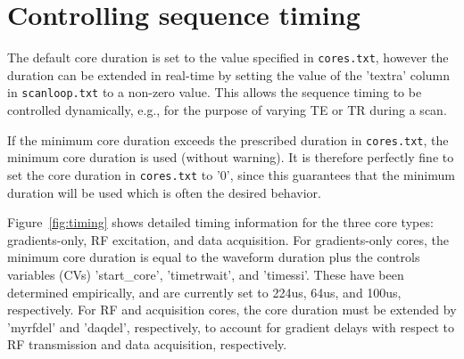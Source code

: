 
\chapter{Controlling sequence timing}
\label{ch:timing}

The default core duration is set to the value specified in \texttt{cores.txt}, however the duration can be extended in real-time by setting the value of the 'textra' column in {\tt scanloop.txt} to a non-zero value.
This allows the sequence timing to be controlled dynamically, e.g., for the purpose of varying TE or TR during a scan.

If the minimum core duration exceeds the prescribed duration in {\tt cores.txt}, the minimum core duration is used (without warning).
It is therefore perfectly fine to set the core duration in {\tt cores.txt} to '0', since this guarantees that the minimum duration will be used which is often the desired behavior.

Figure~\ref{fig:timing} shows detailed timing information for the three core types: gradients-only, RF excitation, and data acquisition.
For gradients-only cores, the minimum core duration is equal to the waveform duration plus the controls variables (CVs) 'start\_core', 'timetrwait', and 'timessi'.
These have been determined empirically, and are currently set to 224us, 64us, and 100us, respectively.
For RF and acquisition cores, the core duration must be extended by 'myrfdel' and 'daqdel', respectively, to account for gradient delays with respect to RF transmission and data acquisition, respectively.
%
%



